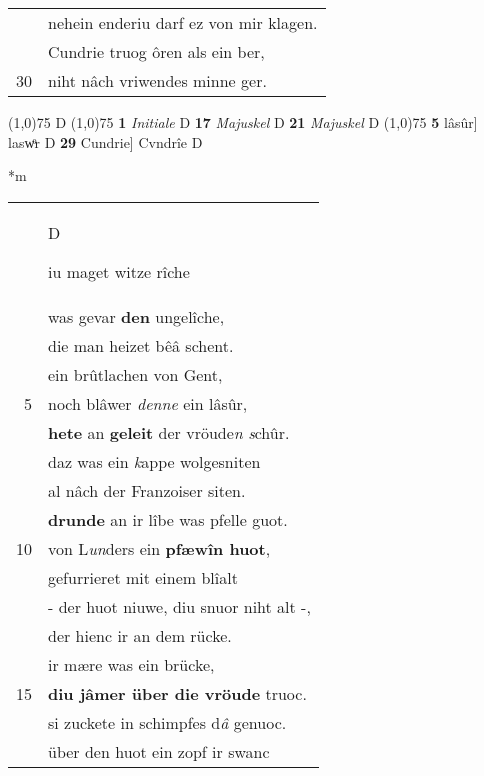 \documentclass[8pt,a4paper,notitlepage]{article}
\begin{document}
\begin{table}[ht]
\begin{minipage}[t]{0.5\linewidth}
\begin{tabular}{rl}
 & nehein enderiu darf ez von mir klagen.\\ 
 & Cundrie truog ôren als ein ber,\\ 
30 & niht nâch vriwendes minne ger.\\ 
\end{tabular}
\scriptsize
\line(1,0){75} \newline
D \newline
\line(1,0){75} \newline
\textbf{1} \textit{Initiale} D  \textbf{17} \textit{Majuskel} D  \textbf{21} \textit{Majuskel} D  \newline
\line(1,0){75} \newline
\textbf{5} lâsûr] laswͦr D \textbf{29} Cundrie] Cvndrîe D \newline
\end{minipage}
\hspace{0.5cm}
\begin{minipage}[t]{0.5\linewidth}
\small
\begin{center}*m
\end{center}
\begin{tabular}{rl}
 & \begin{large}D\end{large}iu maget witze rîche\\ 
 & was gevar \textbf{den} ungelîche,\\ 
 & die man heizet bêâ schent.\\ 
 & ein brûtlachen von Gent,\\ 
5 & noch blâwer \textit{denne} ein lâsûr,\\ 
 & \textbf{hete} an \textbf{geleit} der vröude\textit{n} \textit{s}chûr.\\ 
 & daz was ein \textit{k}appe wolgesniten\\ 
 & al nâch der Franzoiser siten.\\ 
 & \textbf{drunde} an ir lîbe was pfelle guot.\\ 
10 & von L\textit{un}ders ein \textbf{pfæwîn huot},\\ 
 & gefurrieret mit einem blîalt\\ 
 & - der huot niuwe, diu snuor niht alt -,\\ 
 & der hienc ir an dem rücke.\\ 
 & ir mære was ein brücke,\\ 
15 & \textbf{diu jâmer über die vröude} truoc.\\ 
 & si zuckete in schimpfes d\textit{â} genuoc.\\ 
 & über den huot ein zopf ir swanc\\ 

\end{tabular}
\end{minipage}
\end{table}
\end{document}
